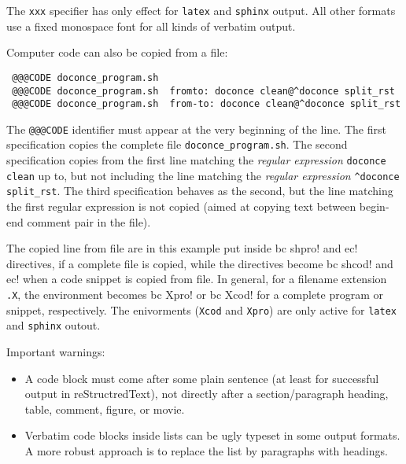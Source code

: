 \documentclass[twoside]{article}
\begin{document}
The {\fontsize{10pt}{10pt}\verb!xxx!} specifier has only effect for {\fontsize{10pt}{10pt}\verb!latex!} and
{\fontsize{10pt}{10pt}\verb!sphinx!} output. All other formats use a fixed monospace font for all
kinds of verbatim output.

Computer code can also be copied from a file:
\begin{Verbatim}
 @@@CODE doconce_program.sh
 @@@CODE doconce_program.sh  fromto: doconce clean@^doconce split_rst
 @@@CODE doconce_program.sh  from-to: doconce clean@^doconce split_rst
\end{Verbatim}
The {\fontsize{10pt}{10pt}\verb!@@@CODE!} identifier must appear at the very beginning of the line.
The first specification copies the complete file {\fontsize{10pt}{10pt}\verb!doconce_program.sh!}.
The second specification copies from the first line matching the \emph{regular
expression} {\fontsize{10pt}{10pt}\verb!doconce clean!} up to, but not including the line
matching the \emph{regular expression} {\fontsize{10pt}{10pt}\verb!^doconce split_rst!}.
The third specification behaves as the second, but the line matching
the first regular expression is not copied (aimed at copying
text between begin-end comment pair in the file).

The copied line from file are in this example put inside {\fontsize{10pt}{10pt}\verb!!bc shpro!}
and {\fontsize{10pt}{10pt}\verb!!ec!} directives, if a complete file is copied, while the
directives become {\fontsize{10pt}{10pt}\verb!!bc shcod!} and {\fontsize{10pt}{10pt}\verb!!ec!} when a code snippet is copied
from file. In general, for a filename extension {\fontsize{10pt}{10pt}\verb!.X!}, the environment
becomes {\fontsize{10pt}{10pt}\verb!!bc Xpro!} or {\fontsize{10pt}{10pt}\verb!!bc Xcod!} for a complete program or snippet,
respectively. The enivorments ({\fontsize{10pt}{10pt}\verb!Xcod!} and {\fontsize{10pt}{10pt}\verb!Xpro!}) are only active
for {\fontsize{10pt}{10pt}\verb!latex!} and {\fontsize{10pt}{10pt}\verb!sphinx!} outout.

Important warnings:

\begin{itemize}
 \item A code block must come after some plain sentence (at least for successful
   output in reStructredText), not directly after a section/paragraph heading,
   table, comment, figure, or movie.

 \item Verbatim code blocks inside lists can be ugly typeset in some
   output formats. A more robust approach is to replace the list by
   paragraphs with headings.
\end{itemize}
\end{document}
